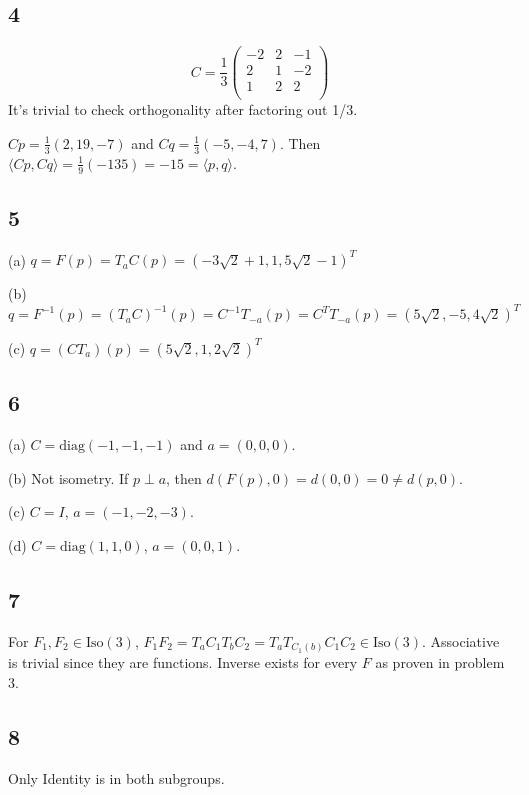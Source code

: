 \documentclass[12pt]{article}
\begin{document}
\subsection*{4}
$$
 C = \frac{1}{3} \begin{pmatrix}
 	-2 & 2 & -1 \\
 	2 & 1 & -2 \\
 	1 & 2 & 2 \\
 \end{pmatrix}
$$
It's trivial to check orthogonality after factoring out 1/3.

$Cp = \frac{1}{3}(2, 19, -7)$ and $Cq=\frac{1}{3}(-5, -4, 7)$. Then $\langle Cp, Cq \rangle = \frac{1}{9} (-135) = -15 = \langle p, q \rangle$.

\subsection*{5}
(a) $q = F(p) = T_a C(p) = (-3\sqrt{2} + 1, 1, 5\sqrt{2} - 1)^T$

(b) $q = F^{-1}(p) = (T_aC)^{-1}(p) = C^{-1}T_{-a}(p) = C^T T_{-a}(p) = (5\sqrt{2}, -5, 4\sqrt{2})^T $

(c) $q = (CT_a)(p) = (5\sqrt{2}, 1, 2\sqrt{2})^T$

\subsection*{6}
(a) $C= \mbox{diag}(-1, -1, -1)$ and $a = (0,0,0)$.

(b) Not isometry. If $p\perp a$, then $d(F(p), 0) = d(0,0) = 0 \neq d(p, 0)$. 

(c) $C = I$, $a = (-1, -2, -3)$.

(d) $C = \mbox{diag}(1, 1, 0)$, $a=(0, 0, 1)$.

\subsection*{7}
For $F_1, F_2 \in \mbox{Iso}(3)$, $F_1F_2 = T_aC_1T_bC_2 = T_aT_{C_1(b)}C_1C_2 \in \mbox{Iso}(3)$. Associative is trivial since they are functions. Inverse exists for every $F$ as proven in problem 3.

\subsection*{8}
Only Identity is in both subgroups.
\end{document}
